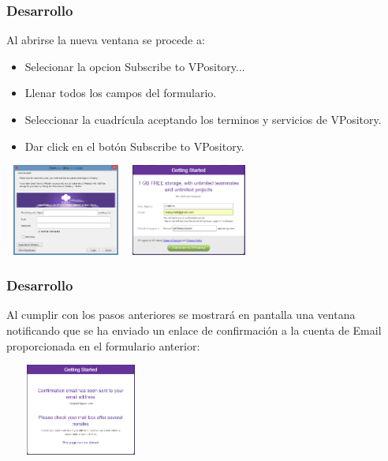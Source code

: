 \documentclass[8pt]{beamer}
\begin{document}
\begin{frame}
\frametitle{Desarrollo}

Al abrirse la nueva ventana se procede a:

\setlength{\parskip}{03pt}
\begin{center}
\begin{itemize}
\item{Selecionar la opcion Subscribe to VPository...}
\item{Llenar todos los campos del formulario.}
\item{Seleccionar la cuadrícula aceptando los terminos y servicios de VPository.}
\item{Dar click en el botón Subscribe to VPository.}
\end{itemize} 

\setlength{\parskip}{08pt}
\includegraphics[width=4cm, height=3cm]{img/cap2} \hspace{0.5cm}
\includegraphics[width=4cm, height=3cm]{img/cap3}
\end{center}
\end{frame}


\begin{frame}
\frametitle{Desarrollo}
\setlength{\parskip}{00pt}
Al cumplir con los pasos anteriores se mostrará en pantalla una ventana notificando que se ha enviado un enlace de confirmación a la cuenta de Email proporcionada en el formulario anterior:
\begin{center}

\setlength{\parskip}{10pt}
\includegraphics[width=5cm, height=3cm]{img/cap4}
\end{center}
\end{frame}
\end{document}
